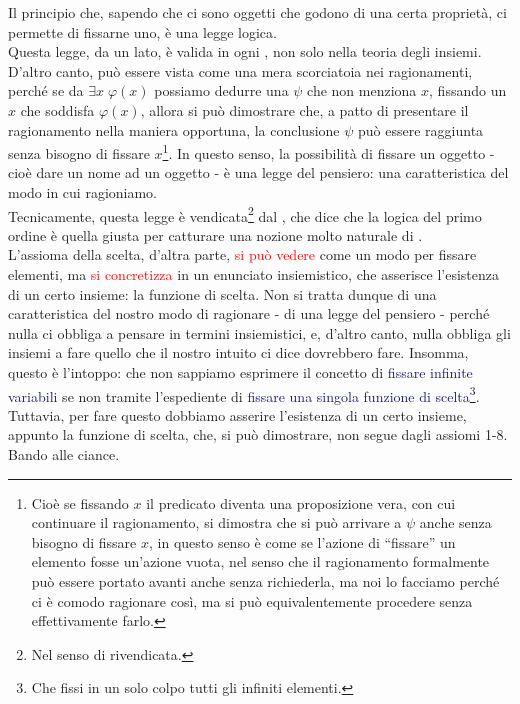 \documentclass[11pt]{scrartcl}
\begin{document}
Il principio che, sapendo che ci sono oggetti che godono di una certa proprietà, ci permette di fissarne uno, è una legge logica.\\
Questa legge, da un lato, è valida in ogni , non solo nella teoria degli insiemi. D'altro canto, può essere vista come una mera scorciatoia nei ragionamenti, perché se da $\exists x \; \varphi(x)$ possiamo dedurre una $\psi$ che non menziona $x$,
fissando un $x$ che soddisfa $\varphi(x)$, allora si può dimostrare che, a patto di presentare il ragionamento nella maniera opportuna, la conclusione $\psi$ può essere raggiunta senza bisogno di fissare $x$\footnote{Cioè se fissando $x$ il predicato diventa una proposizione vera, con cui continuare il ragionamento, si dimostra che si può arrivare a $\psi$ anche senza 
bisogno di fissare $x$, in questo senso è come se l'azione di ``fissare'' un elemento fosse un'azione vuota, nel senso che il ragionamento formalmente può essere portato avanti anche senza richiederla, ma noi lo facciamo perché ci è comodo ragionare così, ma si può equivalentemente procedere senza effettivamente farlo.}. In questo senso, la possibilità
di fissare un oggetto - cioè dare un nome ad un oggetto - è una legge del pensiero: una caratteristica del modo in cui ragioniamo.\\
Tecnicamente, questa legge è vendicata\footnote{Nel senso di rivendicata.} dal , che dice che la logica del primo ordine è quella giusta per catturare una nozione molto naturale di .\\
L'assioma della scelta, d'altra parte, \textcolor{red}{si può vedere} come un modo per fissare elementi, ma \textcolor{red}{si concretizza} in un enunciato insiemistico, che asserisce l'esistenza di un certo insieme: la funzione di scelta.
Non si tratta dunque di una caratteristica del nostro modo di ragionare - di una legge del pensiero - perché nulla ci obbliga a pensare in termini insiemistici, e, d'altro canto, nulla obbliga gli insiemi a fare quello che il nostro intuito ci dice dovrebbero fare.
Insomma, questo è l'intoppo: che non sappiamo esprimere il concetto di \textcolor{MidnightBlue}{fissare infinite variabili} se non tramite l'espediente di \textcolor{MidnightBlue}{fissare una singola funzione di scelta}\footnote{Che fissi in un solo colpo tutti gli infiniti elementi.}. Tuttavia, per fare questo dobbiamo asserire l'esistenza di un certo insieme, appunto la funzione di scelta,
che, si può dimostrare, non segue dagli assiomi 1-8.\\
Bando alle ciance.
\end{document}
